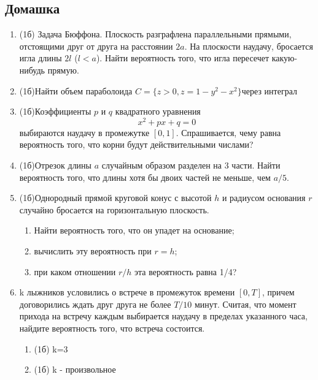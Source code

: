\documentclass[a4paper, 14pt]{extarticle}
\begin{document}
\subsection*{Домашка}
\begin{enumerate}
	\item (1б) Задача Бюффона. Плоскость разграфлена параллельными
	прямыми, отстоящими друг от друга на расстоянии $2a$. На плоскости
	наудачу, бросается игла длины $2l$ ($l<a$). Найти вероятность того, что
	игла пересечет какую-нибудь прямую.
    \item (1б)Найти объем параболоида $C = \{z>0,z = 1-y^2-x^2\}$через интеграл
    \item (1б)Коэффициенты $p$ и $q$ квадратного уравнения
	$$x^2 + px + q = 0$$
	выбираются наудачу в промежутке $[0,1]$. Спрашивается, чему равна 
	вероятность того, что корни будут действительными числами?
	
	\item (1б)Отрезок длины $a$ случайным образом разделен на 3 части. Найти вероятность того, 
	что длины хотя бы двоих частей не меньше, чем $a/5$.
	\item (1б)Однородный прямой круговой конус с 
	высотой $h$ и радиусом основания $r$ случайно бросается на
	горизонтальную плоскость.
	\begin{enumerate}
		\item Найти вероятность того,
	что он упадет на основание; 
		\item вычислить эту 
	вероятность при $r=h$; 
	\item при каком отношении $r/h$ эта 
	вероятность равна 1/4?
	\end{enumerate}
	\item k лыжников условились о встрече в промежуток времени $[0,T]$, причем договорились
	ждать друг друга не более $T/10$ минут. Считая, что
	момент прихода на встречу каждым выбирается наудачу в пределах
	указанного часа, найдите вероятность того, что встреча состоится.
	\begin{enumerate}
	    \item (1б) k=3
	    \item (1б) k - произвольное
	\end{enumerate}
\end{enumerate}
	
\end{document}
